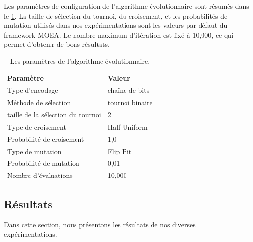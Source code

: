 Les paramètres de configuration de l'algorithme évolutionnaire sont résumés dans le \ref{tab:moea-param}. La taille de sélection du tournoi, du croisement, et les probabilités de mutation utilisés dans nos expérimentations sont les valeurs par défaut du framework MOEA. Le nombre maximum d'itération est fixé à 10,000, ce qui permet d'obtenir de bons résultats.
\begin{table}
\caption {Les paramètres de l'algorithme évolutionnaire.} \label{tab:moea-param}
\centering
    \begin{tabular}{ll}
    \toprule
    \textbf{Paramètre} & \textbf{Valeur} \\
    \midrule
    Type d'encodage & chaîne de bits \\
    Méthode de sélection & tournoi binaire \\ 
    taille de la sélection du tournoi & 2 \\ 
    Type de croisement & Half Uniform \\ 
    Probabilité de croisement & 1,0 \\ 
    Type de mutation & Flip Bit \\ 
    Probabilité de mutation & 0,01 \\ 
    Nombre d'évaluations & 10,000 \\
    \bottomrule
    \end{tabular}
\end{table}


\subsection{Résultats}\label{subsec:Results}
Dans cette section, nous présentons les résultats de nos diverses expérimentations.

